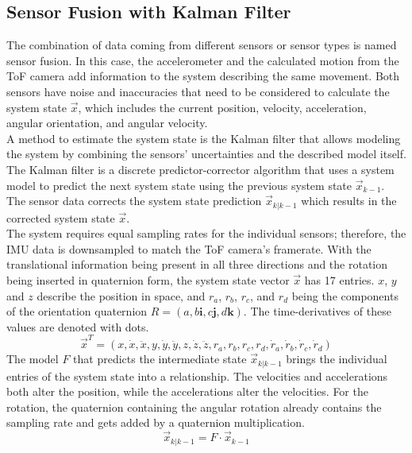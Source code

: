 \subsection{Sensor Fusion with Kalman Filter}
\label{sec:SensorFusion}
The combination of data coming from different sensors or sensor types is named sensor fusion. In this case, the accelerometer and the calculated motion from the ToF camera add information to the system describing the same movement. Both sensors have noise and inaccuracies that need to be considered to calculate the system state $\vec{x}$, which includes the current position, velocity, acceleration, angular orientation, and angular velocity.\\
A method to estimate the system state is the Kalman filter that allows modeling the system by combining the sensors' uncertainties and the described model itself. The Kalman filter is a discrete predictor-corrector algorithm that uses a system model to predict the next system state using the previous system state $\vec{x}_{k-1}$. The sensor data corrects the system state prediction $\vec{x}_{k|k-1}$ which results in the corrected system state $\vec{x}$.\\
The system requires equal sampling rates for the individual sensors; therefore, the IMU data is downsampled to match the ToF camera's framerate.
With the translational information being present in all three directions and the rotation being inserted in quaternion form, the system state vector $\vec{x}$ has 17 entries. $x$, $y$ and $z$ describe the position in space, and $r_{a}$, $r_{b}$, $r_{c}$, and $r_{d}$ being the components of the orientation quaternion $R = (a, b\textbf{i}, c\textbf{j}, d\textbf{k})$. The time-derivatives of these values are denoted with dots.
\begin{equation*}
    \vec{x}^{T} = (
        x, \dot{x}, \ddot{x}, y, \dot{y}, \ddot{y}, z, \dot{z}, \ddot{z}, r_{a}, r_{b}, r_{c}, r_{d}, \dot{r}_{a}, \dot{r}_{b}, \dot{r}_{c}, \dot{r}_{d})
\end{equation*}
The model $F$ that predicts the intermediate state $\vec{x}_{k|k-1}$ brings the individual entries of the system state into a relationship. The velocities and accelerations both alter the position, while the accelerations alter the velocities. For the rotation, the quaternion containing the angular rotation already contains the sampling rate and gets added by a quaternion multiplication. 
\begin{equation*}
    \vec{x}_{k|k-1} = 
    F
    \cdot
    \vec{x}_{k-1}
\end{equation*}
